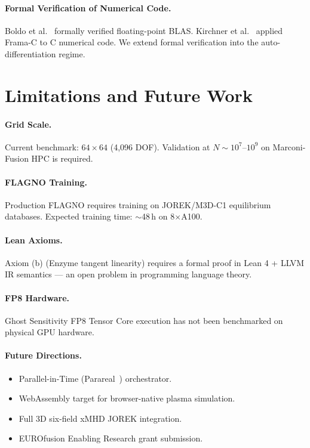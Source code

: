 \documentclass[11pt,twocolumn]{article}
\begin{document}
\paragraph{Formal Verification of Numerical Code.}
Boldo et al.~\cite{boldo2013} formally verified floating-point BLAS.
Kirchner et al.~\cite{kirchner2015} applied Frama-C to C numerical code.
We extend formal verification into the auto-differentiation regime.

\section{Limitations and Future Work}

\paragraph{Grid Scale.} Current benchmark: $64\times64$ (4,096 DOF).
Validation at $N\sim10^7$--$10^9$ on Marconi-Fusion HPC is required.

\paragraph{FLAGNO Training.} Production FLAGNO requires training on
JOREK/M3D-C1 equilibrium databases. Expected training time: $\sim$48\,h
on 8$\times$A100.

\paragraph{Lean Axioms.} Axiom (b) (Enzyme tangent linearity) requires
a formal proof in Lean 4 + LLVM IR semantics — an open problem in
programming language theory.

\paragraph{FP8 Hardware.} Ghost Sensitivity FP8 Tensor Core execution
has not been benchmarked on physical GPU hardware.

\paragraph{Future Directions.}
\begin{itemize}
  \item Parallel-in-Time (Parareal~\cite{lions2001}) orchestrator.
  \item WebAssembly target for browser-native plasma simulation.
  \item Full 3D six-field xMHD JOREK integration.
  \item EUROfusion Enabling Research grant submission.
\end{itemize}
\end{document}

